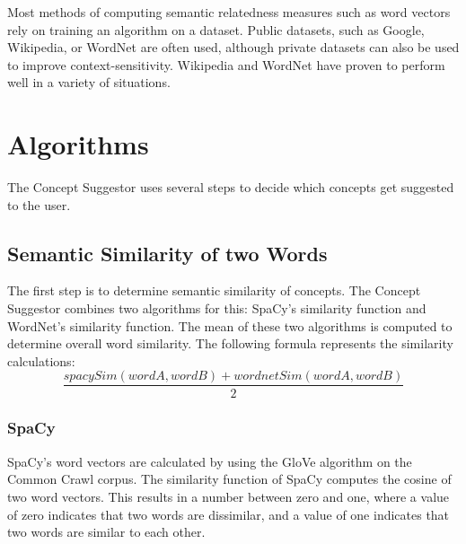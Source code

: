\documentclass{article}
\begin{document}
Most methods of computing semantic relatedness measures such as word vectors rely on training an algorithm on a dataset. Public datasets, such as Google, Wikipedia, or WordNet are often used, although private datasets can also be used to improve context-sensitivity. Wikipedia and WordNet have proven to perform well in a variety of situations\cite{strube2006wikirelate}. %

\section{Algorithms}

The Concept Suggestor uses several steps to decide which concepts get suggested to the user. %

\subsection{Semantic Similarity of two Words}

The first step is to determine semantic similarity of concepts. The Concept Suggestor combines two algorithms for this: SpaCy's similarity function and WordNet's similarity function. The mean of these two algorithms is computed to determine overall word similarity. The following formula represents the similarity calculations: %
\begin{equation} \label{eq:totalsimilarity}
	\frac{spacySim(wordA, wordB) + wordnetSim(wordA, wordB)} {2}
\end{equation}

\subsubsection{SpaCy}
SpaCy's word vectors are calculated by using the GloVe algorithm on the Common Crawl corpus. The similarity function of SpaCy computes the cosine of two word vectors. This results in a number between zero and one, where a value of zero indicates that two words are dissimilar, and a value of one indicates that two words are similar to each other. %
\end{document}
